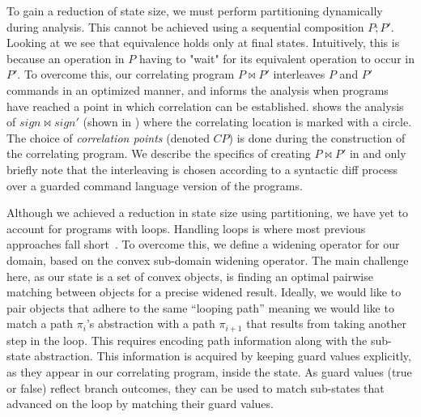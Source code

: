 To gain a reduction of state size, we must perform partitioning dynamically during analysis. This cannot be achieved using a sequential composition $P;P'$. Looking at  we see that equivalence holds only at final states. Intuitively, this is because an operation in $P$ having to "wait" for its equivalent operation to occur in $P'$. To overcome this, our correlating program $P \bowtie P'$ interleaves $P$ and $P'$ commands in an optimized manner, and informs the analysis when programs have reached a point in which correlation can be established.  
 shows the analysis of $sign \bowtie sign'$ (shown in ) where the correlating location is marked with a circle. The choice of \emph{correlation points} (denoted $CP$) is done during the construction of the correlating program. We describe the specifics of creating $P \bowtie P'$ in  and only briefly note that the interleaving is chosen according to a syntactic diff process over a guarded command language version of the programs.



Although we achieved a reduction in state size using partitioning, we have yet to account for programs with loops. Handling loops is where most previous approaches fall short~\cite{GodlinStrichman09, KawaguchiLahiriRebelo10, DwyerElbaumPerson08, EnglerRamos11}. To overcome this, we define a widening operator for our domain, based on the convex sub-domain widening operator. The main challenge here, as our state is a set of convex objects, is finding an optimal pairwise matching between objects for a precise widened result. Ideally, we would like to pair objects that adhere to the same ``looping path'' meaning we would like to match a path $\pi_i$'s abstraction with a path $\pi_{i+1}$ that results from taking another step in the loop. This requires encoding path information along with the sub-state abstraction. This information is acquired by keeping guard values explicitly, as they appear in our correlating program, inside the state. As guard values (true or false) reflect branch outcomes, they can be used to match sub-states that advanced on the loop by matching their guard values.



